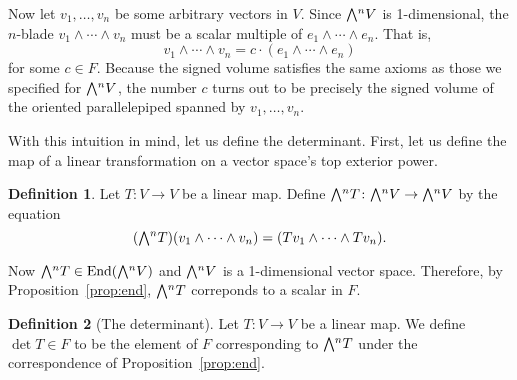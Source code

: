 \documentclass[11pt,oneside]{amsart}
\theoremstyle{definition}
\newtheorem{definition}{Definition}
\theoremstyle{plain}
\newcommand{\extp}{\mathchoice{{\textstyle\bigwedge}}%
    {{\bigwedge}}%
    {{\textstyle\wedge}}%
    {{\scriptstyle\wedge}}}
\DeclareMathOperator{\End}{End}
\begin{document}
Now let $v_1,\dots,v_n$ be some arbitrary vectors in $V$. Since $\extp^n V$ is 1-dimensional, the $n$-blade $v_1\wedge\cdots\wedge v_n$ must be a scalar multiple of $e_1\wedge\cdots \wedge e_n$. That is,
\[v_1\wedge\cdots\wedge v_n=c\cdot (e_1\wedge\cdots \wedge e_n)\]
for some $c\in F$. Because the signed volume satisfies the same axioms as those we specified for $\extp^n V$, the number $c$ turns out to be precisely the signed volume of the oriented parallelepiped spanned by $v_1,\dots,v_n$.

With this intuition in mind, let us define the determinant. First, let us define the map of a linear transformation on a vector space's top exterior power.
\begin{definition}
    Let $T\colon V\to V$ be a linear map. Define $\extp^n T\colon \extp^n V\to\extp^n V$ by the equation
    \[(\extp^n T)(v_1\wedge\cdots\wedge v_n)=(Tv_1\wedge \cdots\wedge Tv_n).\]
\end{definition}
Now $\extp^n T\in\End(\extp^n V)$ and $\extp^n V$ is a 1-dimensional vector space. Therefore, by Proposition~\ref{prop:end}, $\extp^n T$ correponds to a scalar in $F$.
\begin{definition}[The determinant]
    Let $T\colon V\to V$ be a linear map. We define $\det T\in F$ to be the element of $F$ corresponding to $\extp^n T$ under the correspondence of Proposition~\ref{prop:end}.
\end{definition}
\end{document}
